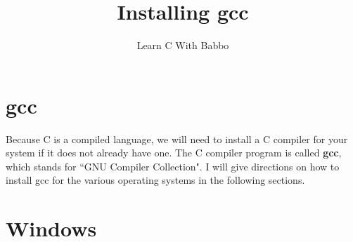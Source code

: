\documentclass{article}
\begin{document}
\title{Installing gcc}
\author{Learn C With Babbo}
\date{}
\maketitle
\section*{gcc}
Because C is a compiled language, we will need to install a C compiler for your system
if it does not already have one. The C compiler program is called \textbf{gcc}, which stands for
``GNU Compiler Collection". I will give
directions on how to install gcc for the various operating systems in the following sections.
\section*{Windows}
\end{document}

